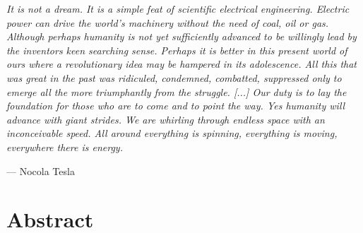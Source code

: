 
\setlength\epigraphrule{0pt}
\renewcommand{\epigraphflush}{center}
\setlength{\epigraphwidth}{0.95\textwidth}

\epigraph{\textit{It is not a dream. It is a simple feat of scientific electrical engineering. Electric power can drive the world's machinery without the need of coal, oil or gas. Although perhaps humanity is not yet sufficiently advanced to be willingly lead by the inventors keen searching sense. Perhaps it is better in this present world of ours where a revolutionary idea may be hampered in its adolescence. All this that was great in the past was ridiculed, condemned, combatted, suppressed only to emerge all the more triumphantly from the struggle. [...] Our duty is to lay the foundation for those who are to come and to point the way. Yes humanity will advance with giant strides. We are whirling through endless space with an inconceivable speed. All around everything is spinning, everything is moving, everywhere there is energy.}}{--- Nocola Tesla}


\chapter*{Abstract}




